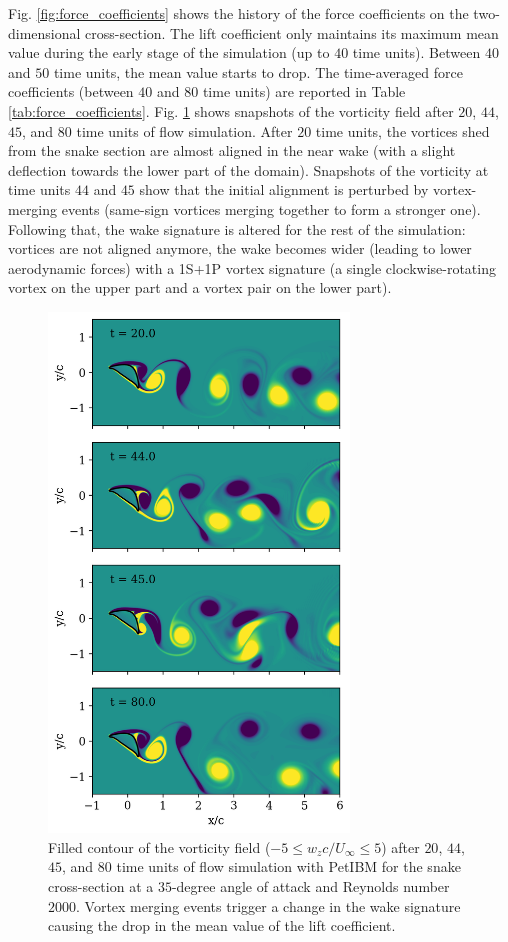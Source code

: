 \documentclass[10pt,journal,compsoc]{IEEEtran}
\begin{document}
Fig. \ref{fig:force_coefficients} shows the history of the force coefficients on the two-dimensional cross-section.
The lift coefficient only maintains its maximum mean value during the early stage of the simulation (up to $40$ time units).
Between $40$ and $50$ time units, the mean value starts to drop.
The time-averaged force coefficients (between $40$ and $80$ time units) are reported in Table \ref{tab:force_coefficients}.
Fig. \ref{fig:wz_2d} shows snapshots of the vorticity field after $20$, $44$, $45$, and $80$ time units of flow simulation.
After $20$ time units, the vortices shed from the snake section are almost aligned in the near wake (with a slight deflection towards the lower part of the domain).
Snapshots of the vorticity at time units $44$ and $45$ show that the initial alignment is perturbed by vortex-merging events (same-sign vortices merging together to form a stronger one).
Following that, the wake signature is altered for the rest of the simulation: vortices are not aligned anymore, the wake becomes wider (leading to lower aerodynamic forces) with a 1S+1P vortex signature (a single clockwise-rotating vortex on the upper part and a vortex pair on the lower part).

\begin{figure}[!h]
    \centering
    \includegraphics[width=8cm]{wz_multi_contourf.png}
    \caption{Filled contour of the vorticity field ($-5 \leq w_z c / U_\infty \leq 5$) after $20$, $44$, $45$, and $80$ time units of flow simulation with PetIBM for the snake cross-section at a $35$-degree angle of attack and Reynolds number $2000$. Vortex merging events trigger a change in the wake signature causing the drop in the mean value of the lift coefficient.}
    \label{fig:wz_2d}
\end{figure}
\end{document}
